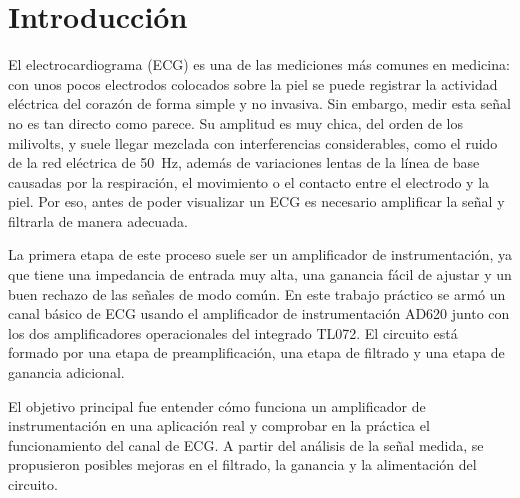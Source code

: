 \section{Introducción}

El electrocardiograma (ECG) es una de las mediciones más comunes en medicina: con unos pocos electrodos colocados sobre la piel se puede registrar la actividad eléctrica del corazón de forma simple y no invasiva.
Sin embargo, medir esta señal no es tan directo como parece.
Su amplitud es muy chica, del orden de los milivolts, y suele llegar mezclada con interferencias considerables, como el ruido de la red eléctrica de 50~Hz, además de variaciones lentas de la línea de base causadas por la respiración, el movimiento o el contacto entre el electrodo y la piel.
Por eso, antes de poder visualizar un ECG es necesario amplificar la señal y filtrarla de manera adecuada.

La primera etapa de este proceso suele ser un amplificador de instrumentación, ya que tiene una impedancia de entrada muy alta, una ganancia fácil de ajustar y un buen rechazo de las señales de modo común.
En este trabajo práctico se armó un canal básico de ECG usando el amplificador de instrumentación AD620 junto con los dos amplificadores operacionales del integrado TL072.
El circuito está formado por una etapa de preamplificación, una etapa de filtrado y una etapa de ganancia adicional.

El objetivo principal fue entender cómo funciona un amplificador de instrumentación en una aplicación real y comprobar en la práctica el funcionamiento del canal de ECG.
A partir del análisis de la señal medida, se propusieron posibles mejoras en el filtrado, la ganancia y la alimentación del circuito.